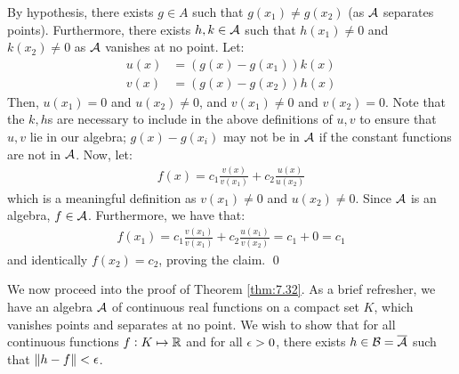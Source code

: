 \begin{nproof}
    By hypothesis, there exists $g \in A$ such that $g(x_1) \neq g(x_2)$ (as $\mathcal{A}$ separates points). Furthermore, there exists $h, k \in \mathcal{A}$ such that $h(x_1) \neq 0$ and $k(x_2) \neq 0$ as $\mathcal{A}$ vanishes at no point. Let:
    \begin{align*}
        u(x) &= (g(x) - g(x_1))k(x)
        \\ v(x) &= (g(x) - g(x_2))h(x)
    \end{align*}
    Then, $u(x_1) = 0$ and $u(x_2) \neq 0$, and $v(x_1) \neq 0$ and $v(x_2) = 0$. Note that the $k, h$s are necessary to include in the above definitions of $u, v$ to ensure that $u, v$ lie in our algebra; $g(x) - g(x_i)$ may not be in $\mathcal{A}$ if the constant functions are not in $\mathcal{A}$. Now, let:
    \begin{align*}
        f(x) = c_1\frac{v(x)}{v(x_1)} + c_2\frac{u(x)}{u(x_2)}
    \end{align*}
    which is a meaningful definition as $v(x_1) \neq 0$ and $u(x_2) \neq 0$. Since $\mathcal{A}$ is an algebra, $f \in \mathcal{A}$. Furthermore, we have that:
    \begin{align*}
        f(x_1) = c_1\frac{v(x_1)}{v(x_1)} + c_2\frac{u(x_1)}{v(x_2)} = c_1 + 0 = c_1
    \end{align*}
    and identically $f(x_2) = c_2$, proving the claim. \qed
\end{nproof}

\noindent We now proceed into the proof of Theorem \ref{thm:7.32}. As a brief refresher, we have an algebra $\mathcal{A}$ of continuous real functions on a compact set $K$, which vanishes points and separates at no point. We wish to show that for all continuous functions $f: K \mapsto \mathbb{R}$ and for all $\epsilon > 0$, there exists $h \in \mathcal{B} = \overline{\mathcal{A}}$ such that $\norm{h - f} < \epsilon$. 

